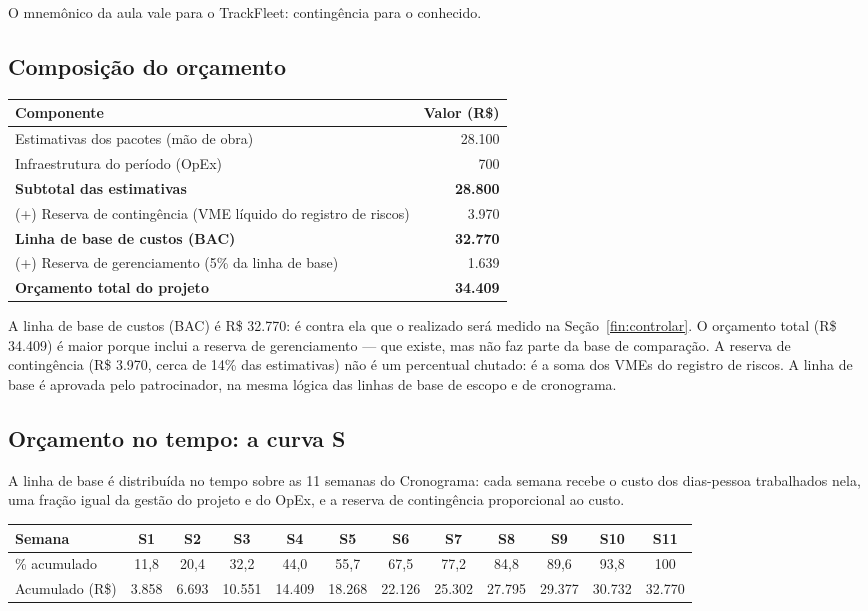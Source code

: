 \documentclass[11pt,a4paper]{article}
\begin{document}
\noindent O mnemônico da aula vale para o TrackFleet: contingência para o conhecido.

\subsection{Composição do orçamento}
\begin{center}
\begin{tabularx}{\textwidth}{L r}
\toprule
\textbf{Componente} & \textbf{Valor (R\$)} \\
\midrule
Estimativas dos pacotes (mão de obra) & 28.100 \\
Infraestrutura do período (OpEx) & 700 \\
\textbf{Subtotal das estimativas} & \textbf{28.800} \\
(+) Reserva de contingência (VME líquido do registro de riscos) & 3.970 \\
\textbf{Linha de base de custos (BAC)} & \textbf{32.770} \\
(+) Reserva de gerenciamento (5\% da linha de base) & 1.639 \\
\textbf{Orçamento total do projeto} & \textbf{34.409} \\
\bottomrule
\end{tabularx}
\end{center}

\noindent A linha de base de custos (BAC) é R\$ 32.770: é contra ela que o realizado será medido na Seção~\ref{fin:controlar}. O orçamento total (R\$ 34.409) é maior porque inclui a reserva de gerenciamento --- que existe, mas não faz parte da base de comparação. A reserva de contingência (R\$ 3.970, cerca de 14\% das estimativas) não é um percentual chutado: é a soma dos VMEs do registro de riscos. A linha de base é aprovada pelo patrocinador, na mesma lógica das linhas de base de escopo e de cronograma.

\subsection{Orçamento no tempo: a curva S}\label{fin:curvas}
A linha de base é distribuída no tempo sobre as 11 semanas do Cronograma: cada semana recebe o custo dos dias-pessoa trabalhados nela, uma fração igual da gestão do projeto e do OpEx, e a reserva de contingência proporcional ao custo.

\begin{center}
\footnotesize
\setlength{\tabcolsep}{3pt}
\begin{tabularx}{\textwidth}{l *{11}{C}}
\toprule
\textbf{Semana} & \textbf{S1} & \textbf{S2} & \textbf{S3} & \textbf{S4} & \textbf{S5} & \textbf{S6} & \textbf{S7} & \textbf{S8} & \textbf{S9} & \textbf{S10} & \textbf{S11} \\
\midrule
\% acumulado & 11,8 & 20,4 & 32,2 & 44,0 & 55,7 & 67,5 & 77,2 & 84,8 & 89,6 & 93,8 & 100 \\
Acumulado (R\$) & 3.858 & 6.693 & 10.551 & 14.409 & 18.268 & 22.126 & 25.302 & 27.795 & 29.377 & 30.732 & 32.770 \\
\bottomrule
\end{tabularx}
\end{center}
\end{document}
